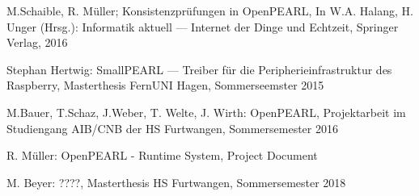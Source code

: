 \begin{thebibliography}{99}
   M.Schaible, R. M\"uller; Konsistenzpr\"ufungen in OpenPEARL,
   In W.A. Halang, H. Unger (Hrsg.): Informatik aktuell --- 
   Internet der Dinge und Echtzeit, Springer Verlag, 2016

    Stephan Hertwig: SmallPEARL ---
    Treiber f\"ur die Peripherieinfrastruktur des Raspberry,
    Masterthesis FernUNI Hagen, Sommerseemster 2015
 
    M.Bauer, T.Schaz, J.Weber, T. Welte, J. Wirth: OpenPEARL,
    Projektarbeit im Studiengang AIB/CNB der HS Furtwangen, Sommersemester 2016

   R. M\"uller: OpenPEARL - Runtime System, Project Document

   M. Beyer: ????,
   Masterthesis HS Furtwangen, Sommersemester 2018

\end{thebibliography}
~                          
